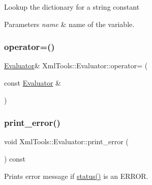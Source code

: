 Lookup the dictionary for a string constant


\begin{DoxyParams}{Parameters}
{\em name} & name of the variable. \\
\hline
\end{DoxyParams}
\hypertarget{class_xml_tools_1_1_evaluator_a78e101bcb596a10ca44871fd3250b0ca}{}\label{class_xml_tools_1_1_evaluator_a78e101bcb596a10ca44871fd3250b0ca} 
\subsubsection{\texorpdfstring{operator=()}{operator=()}}
{\footnotesize\ttfamily \hyperlink{class_xml_tools_1_1_evaluator}{Evaluator}\& Xml\+Tools\+::\+Evaluator\+::operator= (\begin{DoxyParamCaption}\item[{const \hyperlink{class_xml_tools_1_1_evaluator}{Evaluator} \&}]{ }\end{DoxyParamCaption})\hspace{0.3cm}{\ttfamily [private]}}

\hypertarget{class_xml_tools_1_1_evaluator_a35b8445b51d7c045e4027aa55e1ddcae}{}\label{class_xml_tools_1_1_evaluator_a35b8445b51d7c045e4027aa55e1ddcae} 
\subsubsection{\texorpdfstring{print\+\_\+error()}{print\_error()}}
{\footnotesize\ttfamily void Xml\+Tools\+::\+Evaluator\+::print\+\_\+error (\begin{DoxyParamCaption}{ }\end{DoxyParamCaption}) const}

Prints error message if \hyperlink{class_xml_tools_1_1_evaluator_af9265974643b0e1b1411ef5cea2b8580}{status()} is an E\+R\+R\+OR. \hypertarget{class_xml_tools_1_1_evaluator_ac9c3b846be94d03ab2c06c68b4a86448}{}\label{class_xml_tools_1_1_evaluator_ac9c3b846be94d03ab2c06c68b4a86448} 
